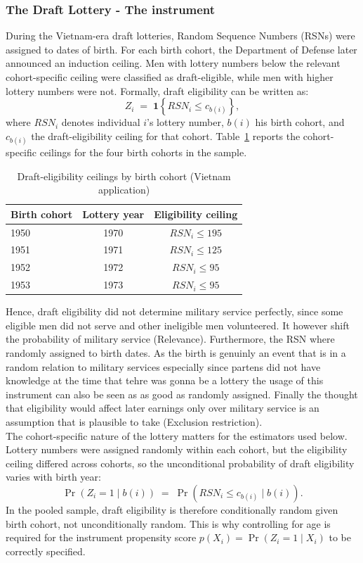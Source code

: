 \documentclass[12pt, a4paper, oneside]{article}
\theoremstyle{plain}
\theoremstyle{definition}
\newcommand{\indic}{\mathbf{1}}
\begin{document}
\subsubsection{The Draft Lottery - The instrument}
During the Vietnam-era draft lotteries, Random Sequence Numbers (RSNs) were assigned to dates of birth. For each birth cohort, the Department of Defense later announced an induction ceiling. Men with lottery numbers below the relevant cohort-specific ceiling were classified as draft-eligible, while men with higher lottery numbers were not. Formally, draft eligibility can be written as: 
\begin{equation}
  Z_i \;=\; \indic\!\left\{RSN_i \leq c_{b(i)}\right\},
  \label{eq:vietnam_z}
\end{equation}
%
where $RSN_i$ denotes individual $i$'s lottery number, $b(i)$ his birth
cohort, and $c_{b(i)}$ the draft-eligibility ceiling for that cohort.
Table~\ref{tab:vietnam_cutoffs} reports the cohort-specific ceilings
for the four birth cohorts in the sample.
\begin{table}[htbp]
\centering
\caption{Draft-eligibility ceilings by birth cohort (Vietnam application)}
\label{tab:vietnam_cutoffs}
\begin{tabular}{@{}lcc@{}}
\toprule
Birth cohort & Lottery year & Eligibility ceiling \\
\midrule
1950 & 1970 & $RSN_i \leq 195$ \\
1951 & 1971 & $RSN_i \leq 125$ \\
1952 & 1972 & $RSN_i \leq 95$  \\
1953 & 1973 & $RSN_i \leq 95$  \\
\bottomrule
\end{tabular}
\end{table}
Hence, draft eligibility did not determine military service perfectly, since some eligible men did not serve and other ineligible men volunteered. It however shift the probability of military service (Relevance).
Furthermore, the RSN where randomly assigned to birth dates. As the birth is genuinly an event that is in a random relation to military services especially since partens did not have knowledge at the time that tehre was gonna be a lottery the usage of this instrument can also be seen as as good as randomly assigned.
Finally the thought that eligibility would affect later earnings only over military service is an assumption that is plausible to take (Exclusion restriction).\\
The cohort-specific nature of the lottery matters for the estimators
used below. Lottery numbers were assigned randomly within each cohort,
but the eligibility ceiling differed across cohorts, so the
unconditional probability of draft eligibility varies with birth year:
%
\begin{equation}
  \Pr(Z_i = 1 \mid b(i)) \;=\; \Pr\!\left(RSN_i \leq c_{b(i)} \mid b(i)\right).
  \label{eq:vietnam_propensity_cohort}
\end{equation}
In the pooled sample, draft eligibility is therefore conditionally
random given birth cohort, not unconditionally random. This is why
controlling for age is required
for the instrument propensity score $p(X_i) = \Pr(Z_i = 1 \mid X_i)$
to be correctly specified.
\end{document}
